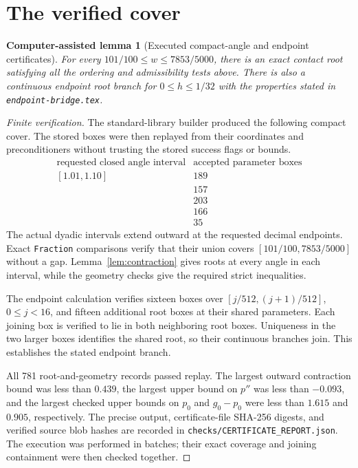 \documentclass[11pt]{article}
\newtheorem{fact}[theorem]{Computer-assisted lemma}
\begin{document}
\section{The verified cover}
\begin{fact}[Executed compact-angle and endpoint certificates]\label{fact:cover}
For every $101/100\le w\le7853/5000$, there is an exact contact root satisfying all the ordering and admissibility tests above. There is also a continuous endpoint root branch for $0\le h\le1/32$ with the properties stated in \texttt{endpoint-bridge.tex}.
\end{fact}
\begin{proof}[Finite verification]
The standard-library builder produced the following compact cover. The stored boxes were then replayed from their coordinates and preconditioners without trusting the stored success flags or bounds.
\[
\begin{array}{c|r}
\text{requested closed angle interval}&\text{accepted parameter boxes}\\\hline
[1.01,1.10]&189\\
[1.10,1.30]&157\\
[1.30,1.50]&203\\
[1.50,1.565]&166\\
[1.565,1.5706]&35
\end{array}
\]
The actual dyadic intervals extend outward at the requested decimal endpoints. Exact \texttt{Fraction} comparisons verify that their union covers $[101/100,7853/5000]$ without a gap. Lemma~\ref{lem:contraction} gives roots at every angle in each interval, while the geometry checks give the required strict inequalities.

The endpoint calculation verifies sixteen boxes over $[j/512,(j+1)/512]$, $0\le j<16$, and fifteen additional root boxes at their shared parameters. Each joining box is verified to lie in both neighboring root boxes. Uniqueness in the two larger boxes identifies the shared root, so their continuous branches join. This establishes the stated endpoint branch.

All 781 root-and-geometry records passed replay. The largest outward contraction bound was less than $0.439$, the largest upper bound on $p''$ was less than $-0.093$, and the largest checked upper bounds on $p_0$ and $g_0-p_0$ were less than $1.615$ and $0.905$, respectively. The precise output, certificate-file SHA-256 digests, and verified source blob hashes are recorded in \texttt{checks/CERTIFICATE\_REPORT.json}. The execution was performed in batches; their exact coverage and joining containment were then checked together.
\end{proof}
\end{document}
